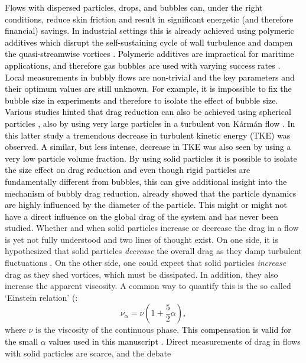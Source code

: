 \documentclass{jfm}
\newcommand{\red}[1]{\textcolor{black}{#1}}
\begin{document}
\red{Flows with dispersed particles, drops, and bubbles can, under the right
conditions, reduce skin friction and result in significant energetic (and
therefore financial) savings. In industrial settings this is already achieved
using polymeric additives which disrupt the self-sustaining cycle of wall
turbulence and dampen the quasi-streamwise vortices
\citep{White2008,Procaccia2008}. Polymeric additives are impractical for
maritime applications, and therefore gas bubbles are used with varying success
rates \citep{Ceccio2010,Murai2014}. Local measurements in bubbly flows are
non-trivial and the key parameters and their optimum values are still unknown.
For example, it is impossible to fix the bubble size in experiments and
therefore to isolate the effect of bubble size. Various studies hinted that
drag reduction can also be achieved using spherical particles
\citep{Zhao2010}, also by using very large particles in a turbulent von
K\'arm\'an flow \citep{Cisse2015}. In this latter study a tremendous decrease
in turbulent kinetic energy (TKE) was observed. A similar, but less intense,
decrease in TKE was also seen by \cite{Bellani2012b} using a very low particle
volume fraction. By using solid particles it is possible to isolate the size
effect on drag reduction and even though rigid particles are fundamentally
different from bubbles, this can give additional insight into the mechanism of
bubbly drag reduction. \cite{Machicoane2016} already showed that the particle
dynamics are highly influenced by the diameter of the particle. This might or
might not have a direct influence on the global drag of the system and has
never been studied.}
%
Whether and when solid particles increase or decrease the drag in a flow is
yet not fully understood and two lines of thought exist. On one side, it is
hypothesized that solid particles {\it decrease} \red{the overall} drag as
they damp turbulent fluctuations \red{\citep{Zhao2010,Poelma2007}}. On the
other side, one could expect that solid particles {\it increase} drag as they
shed vortices, which must be dissipated. In addition, they also increase the
apparent viscosity. A common way to quantify this is the so called `Einstein
relation' (\cite{Einstein1906}: \begin{equation} \nu_\alpha = \nu\left(1 +
\frac{5}{2}\alpha \right), \label{eq:einstein} \end{equation} where $\nu$ is
the viscosity of the continuous phase. \red{This compensation is valid for the
small $\alpha$ values used in this manuscript \citep{Stickel2005}.} Direct
measurements of drag in flows with solid particles are scarce, and the debate
\end{document}
